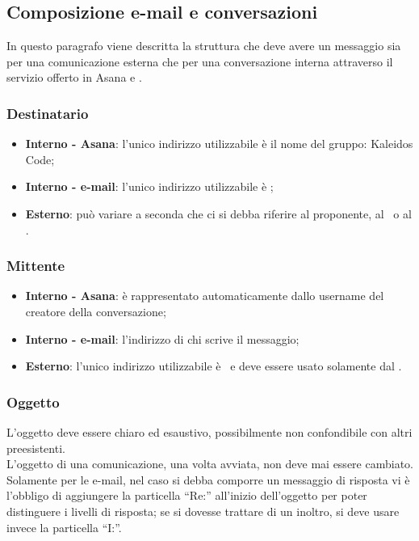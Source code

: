 \documentclass[../NormeDiProgetto.tex]{subfiles}
\begin{document}
		\subsection{Composizione e-mail e conversazioni}
			In questo paragrafo viene descritta la struttura che deve avere
			un messaggio sia per una comunicazione esterna che per una
			conversazione interna attraverso il servizio offerto in Asana e
			.
			\subsubsection{Destinatario}
				\begin{itemize}
					\item \textbf{Interno - Asana}: l'unico indirizzo utilizzabile è
					il nome del gruppo: Kaleidos Code;
					\item \textbf{Interno - e-mail}: l'unico indirizzo utilizzabile è
					\mailkaleidoscode;
					\item \textbf{Esterno}: può variare a seconda che ci si debba
					riferire  al proponente, al \vardanega\ o al \cardin.
				\end{itemize}
			\subsubsection{Mittente}
				\begin{itemize}
					\item \textbf{Interno - Asana}: è rappresentato automaticamente
					dallo username del creatore della conversazione;
					\item \textbf{Interno - e-mail}: l'indirizzo di chi scrive
					il messaggio;
					\item \textbf{Esterno}: l'unico indirizzo utilizzabile è
					\mailkaleidoscode\ e deve essere usato solamente dal
					\responsabilediprogetto.
				\end{itemize}
			\subsubsection{Oggetto}
				L'oggetto deve essere chiaro ed esaustivo, possibilmente non
				confondibile con altri preesistenti.\\
				L'oggetto di una comunicazione, una volta avviata, non deve mai essere cambiato.\\
				Solamente per le e-mail, nel caso si debba
				comporre un messaggio di risposta vi è l'obbligo di aggiungere la
				particella ``Re:'' all'inizio dell'oggetto per poter distinguere i
				livelli di risposta; se si dovesse trattare di un inoltro, si deve
				usare invece la particella ``I:''.
\end{document}
